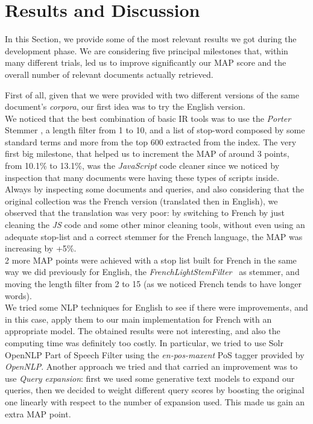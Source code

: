 \pagebreak
\section{Results and Discussion}

\label{sec:results}


In this Section, we provide some of the most relevant results we got during the development phase.
We are considering five principal milestones that, within many different trials, led us to improve significantly our \ac{MAP} score and the overall number of relevant documents actually retrieved.

First of all, given that we were provided with two different versions of the same document's \textit{corpora}, our first idea was to try the English version.\\
We noticed that the best combination of basic \ac{IR} tools was to use the \textit{Porter} Stemmer \cite{solrporterstemfilter}, a length filter from 1 to 10, and a list of stop-word composed by some standard terms and more from the top 600 extracted from the index.
The very first big milestone, that helped us to increment the \ac{MAP} of around 3 points, from 10.1\% to 13.1\%, was the \textit{JavaScript} code cleaner since we noticed by inspection that many documents were having these types of scripts inside.\\
Always by inspecting some documents and queries, and also considering that the original collection was the French version (translated then in English), we observed that the translation was very poor: by switching to French
by just cleaning the \textit{JS} code and some other minor cleaning tools, without even using an adequate stop-list and a correct stemmer for the French language, the \ac{MAP} was increasing by +5\%. \\
2 more \ac{MAP} points were achieved with a stop list built for French in the same way we did previously for English, the \textit{FrenchLightStemFilter}~\cite{solrfrenchlightstemfilter} as stemmer, and moving the length filter from 2 to 15 (as we noticed French tends to have longer words). \\
We tried some \ac{NLP} techniques for English to see if there were improvements, and in this case, apply them to our main implementation for French with an appropriate model. The obtained results were not interesting, and also the computing time was definitely too costly. In particular, we tried to use Solr OpenNLP Part of Speech Filter \cite{solropennlpposfilter} using the \textit{en-pos-maxent} \ac{PoS} tagger provided by \textit{OpenNLP}.
Another approach we tried and that carried an improvement was to use \textit{Query expansion}: first we used some generative text models to expand our queries, then we decided to weight different query scores by boosting the original one linearly with respect to the number
of expansion used. This made us gain an extra \ac{MAP} point.

